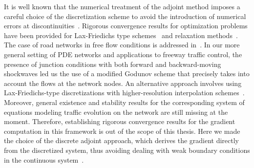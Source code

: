 It is well known that the numerical treatment of the adjoint method imposes a careful choice of the discretization scheme to avoid the introduction of numerical errors  at discontinuities~\cite{Apice2010Modeling}.
Rigorous convergence results for optimization problems have been provided for Lax-Friedichs type schemes~\cite{Giles2010Convergencea} and relaxation methods~\cite{Banda2012Adjoint}.
The case of road networks in free flow conditions is addressed in~\cite{Gugat2005}.
In our more general setting of PDE networks and applications to freeway traffic control, the presence of junction conditions with both forward and backward-moving shockwaves led us the use of a modified Godunov scheme that precisely takes into account the flows at the network nodes. An alternative approach involves using Lax-Friedichs-type discretizations with higher-resolution interpolation schemes~\cite{Nessyahu1990NonOscillatory}. Moreover, general existence and stability results for the corresponding system of equations modeling traffic evolution on the network are still missing at the moment.
Therefore, establishing rigorous convergence results for the gradient computation in this framework is out of the scope of this thesis. Here we made the choice of the discrete adjoint approach, which derives the gradient directly from the discretized system, thus avoiding dealing with weak boundary conditions in the continuous system~\cite{garavello2006traffic,work2010traffic,strub2006weak}.







